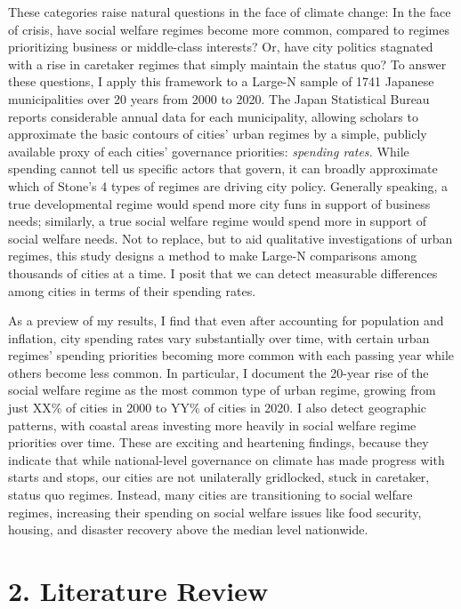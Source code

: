 \documentclass[preprint, 3p,
authoryear]{elsarticle} %
\begin{document}
These categories raise natural questions in the face of climate change:
In the face of crisis, have social welfare regimes become more common,
compared to regimes prioritizing business or middle-class interests? Or,
have city politics stagnated with a rise in caretaker regimes that
simply maintain the status quo? To answer these questions, I apply this
framework to a Large-N sample of 1741 Japanese municipalities over 20
years from 2000 to 2020. The Japan Statistical Bureau reports
considerable annual data for each municipality, allowing scholars to
approximate the basic contours of cities' urban regimes by a simple,
publicly available proxy of each cities' governance priorities:
\emph{spending rates.} While spending cannot tell us specific actors
that govern, it can broadly approximate which of Stone's
\citeyearpar{stone_1993} 4 types of regimes are driving city policy.
Generally speaking, a true developmental regime would spend more city
funs in support of business needs; similarly, a true social welfare
regime would spend more in support of social welfare needs. Not to
replace, but to aid qualitative investigations of urban regimes, this
study designs a method to make Large-N comparisons among thousands of
cities at a time. I posit that we can detect measurable differences
among cities in terms of their spending rates.

As a preview of my results, I find that even after accounting for
population and inflation, city spending rates vary substantially over
time, with certain urban regimes' spending priorities becoming more
common with each passing year while others become less common. In
particular, I document the 20-year rise of the social welfare regime as
the most common type of urban regime, growing from just XX\% of cities
in 2000 to YY\% of cities in 2020. I also detect geographic patterns,
with coastal areas investing more heavily in social welfare regime
priorities over time. These are exciting and heartening findings,
because they indicate that while national-level governance on climate
has made progress with starts and stops, our cities are not unilaterally
gridlocked, stuck in caretaker, status quo regimes. Instead, many cities
are transitioning to social welfare regimes, increasing their spending
on social welfare issues like food security, housing, and disaster
recovery above the median level nationwide.

\hypertarget{literature-review}{%
\section{2. Literature Review}\label{literature-review}}
\end{document}
